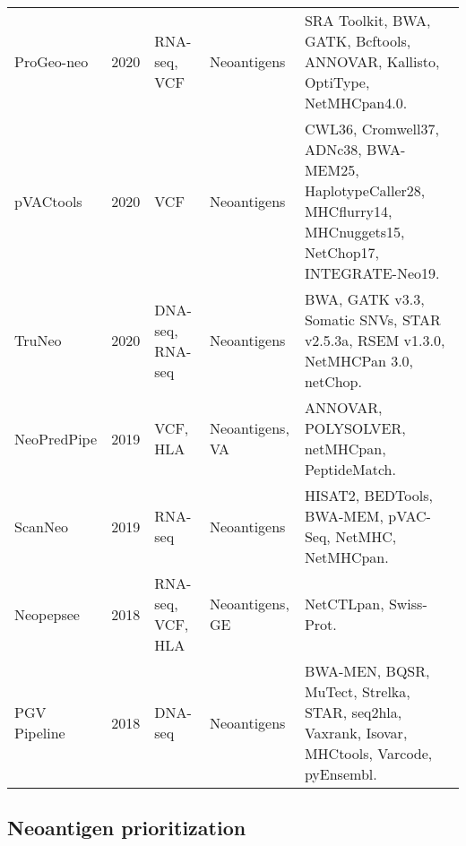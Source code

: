 \begin{table}[h]
{{\begin{tabular}{p{1.7cm}lp{2.2cm}p{2.2cm}p{7.5cm}}
				ProGeo-neo & 2020 \cite{li2020progeo} & RNA-seq, VCF & Neoantigens & SRA Toolkit, BWA, GATK, Bcftools, ANNOVAR, Kallisto, OptiType, NetMHCpan4.0. \\
				pVACtools & 2020 \cite{hundal2020pvactools} & VCF & Neoantigens & CWL36, Cromwell37, ADNc38, BWA-MEM25, HaplotypeCaller28, MHCflurry14, MHCnuggets15, NetChop17, INTEGRATE-Neo19. \\
				TruNeo & 2020  \cite{tang2020truneo} & DNA-seq, RNA-seq & Neoantigens & BWA, GATK v3.3, Somatic SNVs, STAR v2.5.3a, RSEM v1.3.0, NetMHCPan 3.0, netChop. \\
				NeoPredPipe & 2019 \cite{schenck2019neopredpipe} & VCF, HLA & Neoantigens, VA & ANNOVAR, POLYSOLVER, netMHCpan, PeptideMatch. \\
				ScanNeo & 2019 \cite{wang2019scanneo} & RNA-seq  & Neoantigens & HISAT2, BEDTools, BWA-MEM, pVAC-Seq, NetMHC, NetMHCpan. \\
				Neopepsee & 2018 \cite{kim2018neopepsee} & RNA-seq, VCF, HLA & Neoantigens, GE & NetCTLpan, Swiss-Prot. \\ 
				PGV Pipeline & 2018 \cite{rubinsteyn2018computational}& DNA-seq & Neoantigens & BWA-MEN, BQSR, MuTect, Strelka, STAR, seq2hla, Vaxrank, Isovar, MHCtools, Varcode, pyEnsembl. \\
			\end{tabular}
		}
	}
\end{table}

\subsection{Neoantigen prioritization}

